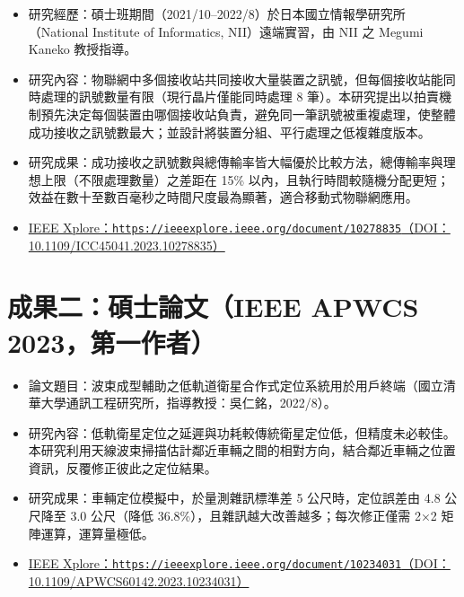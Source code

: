 \documentclass[11pt,fontset=none]{ctexart}
\newcommand{\paperlink}[2]{\href{#1}{\small IEEE Xplore：\texttt{#1}（DOI：#2）}}
\begin{document}
\begin{itemize}
  \item 研究經歷：碩士班期間（2021/10--2022/8）於日本國立情報學研究所（National Institute of Informatics, NII）遠端實習，由 NII 之 Megumi Kaneko 教授指導。
  \item 研究內容：物聯網中多個接收站共同接收大量裝置之訊號，但每個接收站能同時處理的訊號數量有限（現行晶片僅能同時處理 8 筆）。本研究提出以拍賣機制預先決定每個裝置由哪個接收站負責，避免同一筆訊號被重複處理，使整體成功接收之訊號數最大；並設計將裝置分組、平行處理之低複雜度版本。
  \item 研究成果：成功接收之訊號數與總傳輸率皆大幅優於比較方法，總傳輸率與理想上限（不限處理數量）之差距在 15\% 以內，且執行時間較隨機分配更短；效益在數十至數百毫秒之時間尺度最為顯著，適合移動式物聯網應用。
  \item \paperlink{https://ieeexplore.ieee.org/document/10278835}{10.1109/ICC45041.2023.10278835}
\end{itemize}

\section{成果二：碩士論文（IEEE APWCS 2023，第一作者）}

\begin{itemize}
  \item 論文題目：波束成型輔助之低軌道衛星合作式定位系統用於用戶終端（國立清華大學通訊工程研究所，指導教授：吳仁銘，2022/8）。
  \item 研究內容：低軌衛星定位之延遲與功耗較傳統衛星定位低，但精度未必較佳。本研究利用天線波束掃描估計鄰近車輛之間的相對方向，結合鄰近車輛之位置資訊，反覆修正彼此之定位結果。
  \item 研究成果：車輛定位模擬中，於量測雜訊標準差 5 公尺時，定位誤差由 4.8 公尺降至 3.0 公尺（降低 36.8\%），且雜訊越大改善越多；每次修正僅需 2×2 矩陣運算，運算量極低。
  \item \paperlink{https://ieeexplore.ieee.org/document/10234031}{10.1109/APWCS60142.2023.10234031}
\end{itemize}
\end{document}
